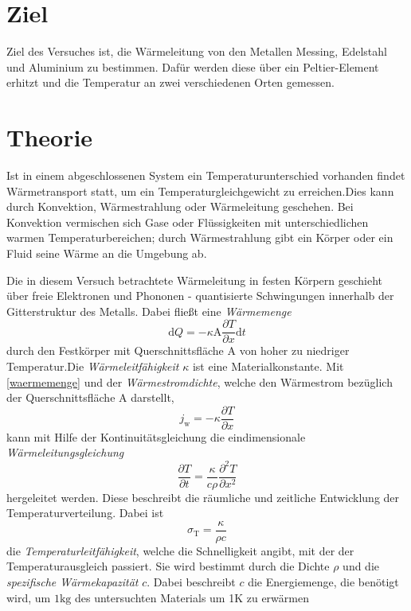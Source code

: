 \section{Ziel}
\label{sec:ziel}

Ziel des Versuches ist, die Wärmeleitung von den Metallen Messing, Edelstahl und Aluminium zu bestimmen. Dafür werden diese über ein Peltier-Element erhitzt und die Temperatur an zwei verschiedenen Orten gemessen.

\section{Theorie}
\label{sec:theorie}

Ist in einem abgeschlossenen System ein Temperaturunterschied vorhanden findet Wärmetransport statt, um ein Temperaturgleichgewicht zu erreichen.Dies kann durch Konvektion, Wärmestrahlung oder Wärmeleitung geschehen. 
Bei Konvektion vermischen sich Gase oder Flüssigkeiten mit unterschiedlichen warmen Temperaturbereichen; durch Wärmestrahlung gibt ein Körper oder ein Fluid seine Wärme an die Umgebung ab.

Die in diesem Versuch betrachtete Wärmeleitung in festen Körpern geschieht über freie Elektronen und Phononen - quantisierte Schwingungen innerhalb der Gitterstruktur des Metalls.
Dabei fließt eine \emph{Wärmemenge} 
\begin{equation}
	\label{waermemenge}
	\mathup{d}Q=-\kappa\mathup{A}\frac{\partial{T}}{\partial{x}}\mathup{d}t
\end{equation}
durch den Festkörper mit Querschnittsfläche A von hoher zu niedriger Temperatur.Die \emph{Wärmeleitfähigkeit} $\kappa$ ist eine Materialkonstante.
Mit \eqref{waermemenge} und der \emph{Wärmestromdichte}, welche den Wärmestrom bezüglich der Querschnittsfläche A darstellt,
\begin{equation}
	\label{waermestromdichte}
	j_\mathup{w}= -\kappa \frac{\partial{T}}{\partial{x}}
\end{equation}
kann mit Hilfe der Kontinuitätsgleichung die eindimensionale \emph{Wärmeleitungsgleichung}
\begin{equation}
	\label{waermeleitungsgleichung}
	\frac{\partial{T}}{\partial{t}} =  \frac{\kappa}{c\rho}\frac{\partial^2{T}}{\partial{x^2}}
\end{equation}
hergeleitet werden.
Diese beschreibt die räumliche und zeitliche Entwicklung der Temperaturverteilung. 
Dabei ist
\begin{equation}
	\label{temperaturleitfaehigkeit}
	\sigma_\mathup{T}=\frac{\kappa}{{\rho}c}
\end{equation}
die \emph{Temperaturleitfähigkeit}, welche die Schnelligkeit angibt, mit der der Temperaturausgleich passiert.
Sie wird bestimmt durch die Dichte $\rho$ und die \emph{spezifische Wärmekapazität} $c$. Dabei beschreibt $c$ die Energiemenge, die benötigt wird, um $1\si{\kilo\gram}$ des untersuchten Materials um 1K zu erwärmen

